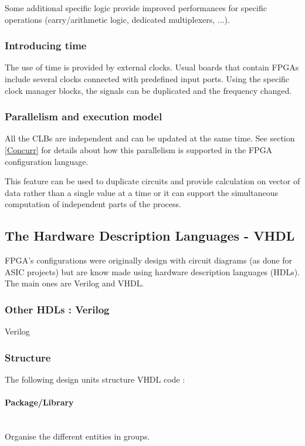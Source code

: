 \documentclass[10pt,a4paper]{article}
\begin{document}
Some additional specific logic provide improved performances for specific operations (carry/arithmetic logic, dedicated multiplexers, ...).

\subsubsection{Introducing time}

The use of time is provided by external clocks. Usual boards that contain FPGAs include several clocks connected with predefined input ports. Using the specific clock manager blocks, the signals can be duplicated and the frequency changed.

\subsubsection{Parallelism and execution model}

All the CLBs are independent and can be updated at the same time. See section \ref{Concurr}
for details about how this parallelism is supported in the FPGA configuration language.

This feature can be used to duplicate circuits and provide calculation on vector of data rather than a single value at a time or it can support the simultaneous computation of independent parts of the process.


\subsection{The Hardware Description Languages - VHDL}

FPGA's configurations were originally design with circuit diagrams (as done for ASIC projects) but are know made using hardware description languages (HDLs). The main ones are Verilog and VHDL.

\subsubsection{Other HDLs : Verilog}


Verilog

\subsubsection{Structure}

The following design units structure VHDL code :

\paragraph{Package/Library}~\\
Organise the different entities in groups.
\end{document}
